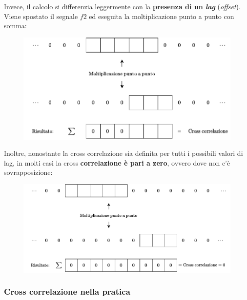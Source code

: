 \documentclass[a4paper]{article}
\begin{document}
	\noindent
	Invece, il calcolo si differenzia leggermente con la \textbf{presenza di un \emph{lag}} (\emph{offset}). Viene spostato il segnale $f2$ ed eseguita la moltiplicazione punto a punto con somma:
	\begin{figure}[!htp]
		\centering
		\includegraphics[width=\textwidth]{img/lab/cross-correlazione-4.pdf}
	\end{figure}
	
	\noindent
	Inoltre, nonostante la cross correlazione sia definita per tutti i possibili valori di lag, in molti casi la cross \textbf{correlazione è pari a zero}, ovvero dove non c'è sovrapposizione:
	\begin{figure}[!htp]
		\centering
		\includegraphics[width=\textwidth]{img/lab/cross-correlazione-5.pdf}
	\end{figure}\newpage
	
	\subsubsection{Cross correlazione nella pratica}
	
\end{document}
